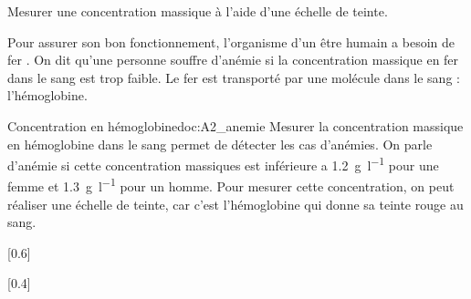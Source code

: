 \teteSndSolu

\vspace*{-36pt}

\begin{objectifs}
  \item Mesurer une concentration massique à l'aide d'une échelle de teinte.
\end{objectifs}


\begin{contexte}
  Pour assurer son bon fonctionnement, l'organisme d'un être humain a besoin de fer .
  On dit qu'une personne souffre d'anémie si la concentration massique en fer dans le sang est trop faible.
  Le fer est transporté par une molécule dans le sang : l'hémoglobine.

\end{contexte}


\begin{doc}{Concentration en hémoglobine}{doc:A2_anemie}
  Mesurer la concentration massique en hémoglobine dans le sang permet de détecter les cas d'anémies.
  On parle d'anémie si cette concentration massiques est inférieure a
  \qty{1,2}{\g\per\litre} pour une femme et \qty{1,3}{\g\per\litre} pour un homme.
  Pour mesurer cette concentration, on peut réaliser une échelle de teinte, car c'est l'hémoglobine qui donne sa teinte rouge au sang.

  [0.6]{
    \begin{center}
  
    \end{center}
  }[0.4]
\end{doc}

